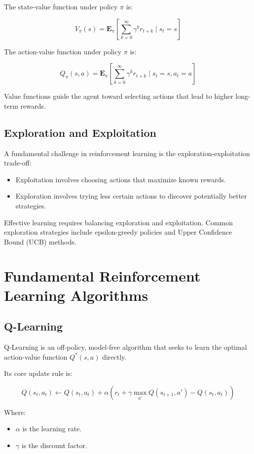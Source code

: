 \documentclass[openany]{book}
\begin{document}
The state-value function under policy \( \pi \) is:

\[
V_\pi(s) = \mathbf{E}_\pi \left[ \sum_{k=0}^{\infty} \gamma^k r_{t+k} 
\mid s_t = s \right]
\]

The action-value function under policy \( \pi \) is:

\[
Q_\pi(s, a) = \mathbf{E}_\pi \left[ \sum_{k=0}^{\infty} \gamma^k r_{t+k} 
\mid s_t = s, a_t = a \right]
\]

Value functions guide the agent toward selecting actions that lead to higher 
long-term rewards.

\subsection{Exploration and Exploitation}

A fundamental challenge in reinforcement learning is the 
exploration-exploitation trade-off:

\begin{itemize}
    \item Exploitation involves choosing actions that maximize known rewards.
    \item Exploration involves trying less certain actions to discover 
    potentially better strategies.
\end{itemize}

Effective learning requires balancing exploration and exploitation. Common 
exploration strategies include epsilon-greedy policies and Upper Confidence 
Bound (UCB) methods.

\section{Fundamental Reinforcement Learning Algorithms}

\subsection{Q-Learning}

Q-Learning is an off-policy, model-free algorithm that seeks to learn the 
optimal action-value function \( Q^*(s,a) \) directly.

Its core update rule is:

\[
Q(s_t, a_t) \leftarrow Q(s_t, a_t) + \alpha \left( r_t + \gamma \max_{a'} 
Q(s_{t+1}, a') - Q(s_t, a_t) \right)
\]

Where:

\begin{itemize}
    \item \( \alpha \) is the learning rate.
    \item \( \gamma \) is the discount factor.
\end{itemize}
\end{document}

